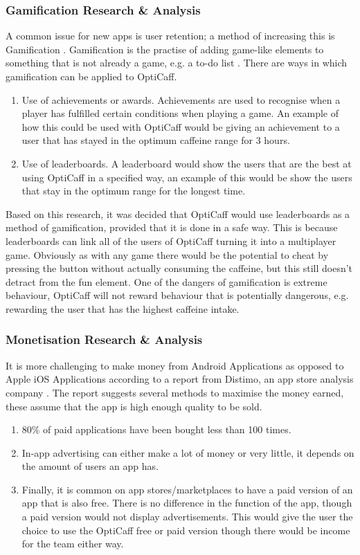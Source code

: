 \subsubsection{Gamification Research \& Analysis}
A common issue for new apps is user retention; a method of increasing this is Gamification \cite{gamification1}. Gamification is the practise of adding game-like elements to something that is not already a game, e.g. a to-do list \cite{gamification2}. There are ways in which gamification can be applied to OptiCaff.

\begin{enumerate}
	\item{Use of achievements or awards. Achievements are used to recognise when a player has fulfilled certain conditions when playing a game. An example of how this could be used with OptiCaff would be giving an achievement to a user that has stayed in the optimum caffeine range for 3 hours.}
	\item{Use of leaderboards. A leaderboard would show the users that are the best at using OptiCaff in a specified way, an example of this would be show the users that stay in the optimum range for the longest time.}
\end{enumerate}

Based on this research, it was decided that OptiCaff would use leaderboards as a method of gamification, provided that it is done in a safe way. 
This is because leaderboards can link all of the users of OptiCaff turning it into a multiplayer game. 
Obviously as with any game there would be the potential to cheat by pressing the button without actually consuming the caffeine, but this still doesn't detract from the fun element. 
One of the dangers of gamification is extreme behaviour, OptiCaff will not reward behaviour that is potentially dangerous, e.g. rewarding the user that has the highest caffeine intake.

\subsubsection{Monetisation Research \& Analysis}
It is more challenging to make money from Android Applications as opposed to Apple iOS Applications according to a report from Distimo, an app store analysis company \cite{monetisiation}. 
The report suggests several methods to maximise the money earned, these assume that the app is high enough quality to be sold.

\begin{enumerate}
	\item{80\% of paid applications have been bought less than 100 times.}
	\item{In-app advertising can either make a lot of money or very little, it depends on the amount of users an app has.}
	\item{Finally, it is common on app stores/marketplaces to have a paid version of an app that is also free. There is no difference in the function of the app, though a paid version would not display advertisements. This would give the user the choice to use the OptiCaff free or paid version though there would be income for the team either way.}
\end{enumerate}

